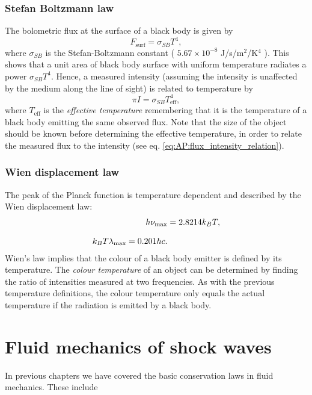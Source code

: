 \subsubsection{Stefan Boltzmann law}
The bolometric flux at the surface of a black body is given by
%
\begin{equation}
	F_\text{surf} = \sigma_{SB} T^4,
	\label{eq:AP:stefan_boltzmann_law}
\end{equation}
%
where \( \sigma_{SB} \) is the Stefan-Boltzmann constant ( \( 5.67 \times 10^{-8} \) J/s/m\( ^2 \)/K\( ^4 \) ).
 This shows that a unit area of black body surface with uniform temperature radiates a power \( \sigma_{SB} T^4 \).
 Hence, a measured intensity (assuming the intensity is unaffected by the medium along the line of sight) is related to temperature by
%
\begin{equation}
	\pi I = \sigma_{SB} T_\text{eff}^4,
	\label{eq:AP:effective_temperature}
\end{equation}
%
where \( T_\text{eff} \) is the \textit{effective temperature} remembering that it is the temperature of a black body emitting the same observed flux.
 Note that the size of the object should be known before determining the effective temperature, in order to relate the measured flux to the intensity (see eq. \ref{eq:AP:flux_intensity_relation}).
%
\subsubsection{Wien displacement law}
The peak of the Planck function is temperature dependent and described by the Wien displacement law:
%
\begin{align}
	h \nu_\text{max} &= 2.8214 k_B T,
	\linedrop
	k_B T \lambda_\text{max} = 0.201 h c.
	\label{eq:AP:wien_displacement_law}
\end{align}
%
Wien's law implies that the colour of a black body emitter is defined by its temperature.
 The \emph{colour temperature} of an object can be determined by finding the ratio of intensities measured at two frequencies.
 As with the previous temperature definitions, the colour temperature only equals the actual temperature if the radiation is emitted by a black body.
%
%
%
\section{Fluid mechanics of shock waves}
In previous chapters we have covered the basic conservation laws in fluid mechanics.
 These include 


